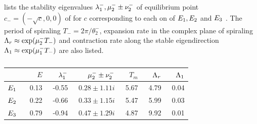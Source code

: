  lists the stability eigenvalues
$\eigExp[1]^-,\eigRe[2]^-\pm\eigIm[2]^-$
of equilibrium point $c_{-}=(-\sqrt{c},0,0)$
of \label{eq:3dks} for $c$ corresponding to each on of $\EQV{1},\EQV{2}$ and $\EQV{3}$ \eqva.
The period of spiraling $T_{-}=2\pi/\theta^-_2$, expansion
rate in the complex plane of spiraling
$\ExpaEig_r\approx\exp(\eigRe[2]^- T_-)$ and contraction
rate along the stable eigendirection
$\ExpaEig_1\approx\exp(\eigRe[1]^- T_-)$ are also listed.

\begin{table}[h!]
    \begin{tabular}{l|rrrrrr}
                & $E$   &$\eigExp[1]^-$ & $\eigRe[2]^-\pm\eigIm[2]^-$   & $T_m$ & $\ExpaEig_r$  & $\ExpaEig_1$  \\ \hline
        $\EQV{1}\ $ &\ 0.13 &\ -0.55    &\ $0.28\pm1.11i$       &\ 5.67     &\ 4.79     &\ 0.04 \\ \hline
        $\EQV{2}\ $     &\ 0.22 &\ -0.66    &\ $0.33\pm1.15i$       &\ 5.47     &\ 5.99     &\ 0.03 \\ \hline
        $\EQV{3}\ $     &\ 0.79 &\ -0.94    &\ $0.47\pm1.29i$       &\ 4.87     &\ 9.92     &\ 0.01
    \end{tabular}
    \caption{}
    \label{tab:L22cminus}
\end{table}



